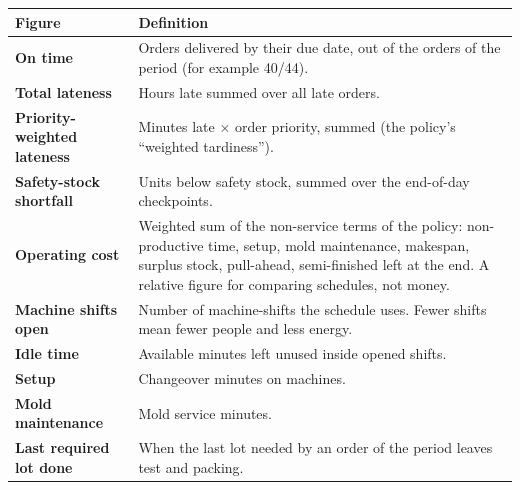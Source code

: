 \begin{longtable}{>{\bfseries}p{4.1cm}p{10.4cm}}
\toprule
\rowcolor{white}Figure & Definition \\
\midrule
\endhead
On time & Orders delivered by their due date, out of the orders of the period (for example 40/44). \\
Total lateness & Hours late summed over all late orders. \\
Priority-weighted lateness & Minutes late $\times$ order priority, summed (the policy's ``weighted tardiness''). \\
Safety-stock shortfall & Units below safety stock, summed over the end-of-day checkpoints. \\
Operating cost & Weighted sum of the non-service terms of the policy: non-productive time, setup, mold maintenance, makespan, surplus stock, pull-ahead, semi-finished left at the end. A relative figure for comparing schedules, not money. \\
Machine shifts open & Number of machine-shifts the schedule uses. Fewer shifts mean fewer people and less energy. \\
Idle time & Available minutes left unused inside opened shifts. \\
Setup & Changeover minutes on machines. \\
Mold maintenance & Mold service minutes. \\
Last required lot done & When the last lot needed by an order of the period leaves test and packing. \\
\bottomrule
\end{longtable}
